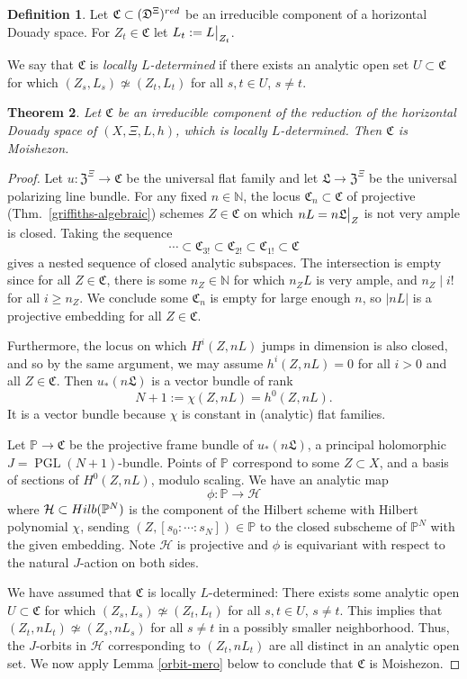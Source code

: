\documentclass[10pt,letterpaper,english,reqno]{amsart}
\numberwithin{equation}{subsection}
\newcommand\cH{{\mathcal H}}
\newcommand\fC{{\mathfrak C}}
\newcommand\fD{{\mathfrak D}}
\newcommand\fL{{\mathfrak L}}
\newcommand\fZ{{\mathfrak Z}}
\newcommand\N{{\mathbb N}}
\newcommand\bP{{\mathbb P}}
\DeclareMathOperator{\PGL}{PGL}
\newtheorem{theorem}{Theorem}[section]
\theoremstyle{definition}
\newtheorem{definition}[theorem]{Definition}
\begin{document}
\begin{definition} Let $\fC\subset (\fD^{\Xi})^{\rm red}$
be an irreducible component of a horizontal Douady space.
For $Z_t\in \fC$ let $L_t:=L\big{|}_{Z_t}$.

We say that $\fC$ is
{\it locally $L$-determined} 
if there exists an analytic open
set $U\subset \fC$ for which 
$(Z_s,L_s)\not\simeq (Z_t,L_t)$
for all $s,t\in U$, $s\neq t$.
\end{definition}

\begin{theorem}\label{main1} Let $\fC$ be 
an irreducible component of the reduction
of the horizontal Douady space of $(X,\Xi,L,h)$,
which is locally $L$-determined.
Then $\fC$ is Moishezon.\end{theorem}

\begin{proof} Let $u\colon \fZ^{\Xi}\to \fC$ be the universal flat family
and let $\fL\to \fZ^{\Xi}$ be the universal polarizing line bundle.
For any fixed $n\in \N$, the locus $\fC_n\subset \fC$ of projective
(Thm.~\ref{griffiths-algebraic}) schemes $Z\in \fC$
on which $nL=n\mathfrak{L}\big{|}_Z$ is not very ample is closed.
Taking the sequence
 $$\cdots\subset \fC_{3!}\subset \fC_{2!}\subset \fC_{1!}\subset \fC$$
gives a nested sequence of closed analytic subspaces.
The intersection is empty since for all $Z\in \fC$, there is
some $n_Z\in \N$ for which $n_ZL$ is very ample, and $n_Z\mid i!$
for all $i\geq n_Z$. We conclude some $\fC_n$ is empty
for large enough $n$, so $|nL|$ is a projective embedding
for all $Z\in \fC$.

Furthermore, the locus on which $H^i(Z,nL)$ jumps in dimension
is also closed, and so by the same argument, we may assume
$h^i(Z,nL)=0$ for all $i>0$ and all $Z\in \fC$. Then $u_*(n\fL)$
is a vector bundle of rank $$N+1:=\chi(Z,nL)= h^0(Z,nL).$$ It is a vector
bundle because $\chi$ is constant in (analytic) flat families.

Let $\bP\to \fC$
be the projective frame bundle of $u_*(n\fL)$, a principal
holomorphic $J=\PGL(N+1)$-bundle. Points of $\bP$ correspond
to some $Z\subset X$, and a basis of sections of
$H^0(Z,nL)$, modulo scaling. We
have an analytic map $$\phi\colon \bP\to \cH$$ where
$\cH\subset {\rm Hilb}(\bP^N)$ is the component of the Hilbert
scheme with Hilbert polynomial $\chi$, sending
$(Z,[s_0:\cdots:s_N])\in \bP$
to the closed subscheme of $\bP^N$ with the given embedding.
Note $\cH$ is projective and $\phi$ is equivariant 
with respect to
the natural $J$-action on both sides. 

We have assumed that
$\fC$ is locally $L$-determined: 
There exists
some analytic open $U\subset \fC$ for which 
$(Z_s,L_s)\not\simeq (Z_t,L_t)$
for all $s,t\in U$, $s\neq t$. This implies that $(Z_t,nL_t)\not\simeq (Z_s,nL_s)$
for all $s\neq t$ in a possibly smaller neighborhood.
Thus, the $J$-orbits in $\cH$ 
corresponding to $(Z_t,nL_t)$ are all distinct
in an analytic open set. 
We now apply Lemma \ref{orbit-mero} below to conclude that $\fC$ is Moishezon.
\end{proof}
\end{document}
